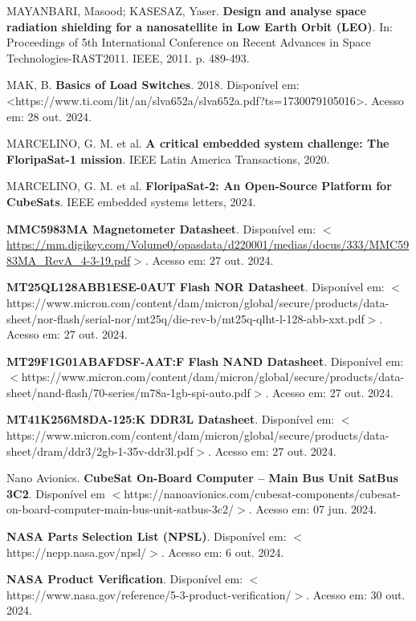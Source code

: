 \begin{flushleft}
\begin{thebibliography}{00}
 MAYANBARI, Masood; KASESAZ, Yaser. \textbf{Design and analyse space radiation shielding for a nanosatellite in Low Earth Orbit (LEO)}. In: Proceedings of 5th International Conference on Recent Advances in Space Technologies-RAST2011. IEEE, 2011. p. 489-493.

 MAK, B. \textbf{Basics of Load Switches}. 2018. Disponível em: <https://www.ti.com/lit/an/slva652a/slva652a.pdf?ts=1730079105016>. Acesso em: 28 out. 2024.

 MARCELINO, G. M. et al. \textbf{A critical embedded system challenge: The FloripaSat-1 mission}. IEEE Latin America Transactions, 2020.

 MARCELINO, G. M. et al. \textbf{FloripaSat-2: An Open-Source Platform for CubeSats}. IEEE embedded systems letters, 2024.

 \textbf{MMC5983MA Magnetometer Datasheet}. Disponível em: $<$\url{https://mm.digikey.com/Volume0/opasdata/d220001/medias/docus/333/MMC5983MA\_RevA\_4-3-19.pdf}$>$. Acesso em: 27 out. 2024. 

 \textbf{MT25QL128ABB1ESE-0AUT Flash NOR Datasheet}. Disponível em: $<$https://www.micron.com/content/dam/micron/global/secure/products/data-sheet/nor-flash/serial-nor/mt25q/die-rev-b/mt25q-qlht-l-128-abb-xxt.pdf$>$. Acesso em: 27 out. 2024. 

 \textbf{MT29F1G01ABAFDSF-AAT:F Flash NAND Datasheet}. Disponível em: $<$https://www.micron.com/content/dam/micron/global/secure/products/data-sheet/nand-flash/70-series/m78a-1gb-spi-auto.pdf$>$. Acesso em: 27 out. 2024. 

 \textbf{MT41K256M8DA-125:K DDR3L Datasheet}. Disponível em: $<$https://www.micron.com/content/dam/micron/global/secure/products/data-sheet/dram/ddr3/2gb-1-35v-ddr3l.pdf$>$. Acesso em: 27 out. 2024. 

 Nano Avionics. \textbf{CubeSat On-Board Computer – Main Bus Unit SatBus 3C2}. Disponível em $<$https://nanoavionics.com/cubesat-components/cubesat-on-board-computer-main-bus-unit-satbus-3c2/$>$. Acesso em: 07 jun. 2024.

 \textbf{NASA Parts Selection List (NPSL)}. Disponível em: $<$https://nepp.nasa.gov/npsl/$>$. Acesso em: 6 out. 2024.

 \textbf{NASA Product Verification}. Disponível em: $<$https://www.nasa.gov/reference/5-3-product-verification/$>$. Acesso em: 30 out. 2024.


\end{thebibliography}
\end{flushleft}
